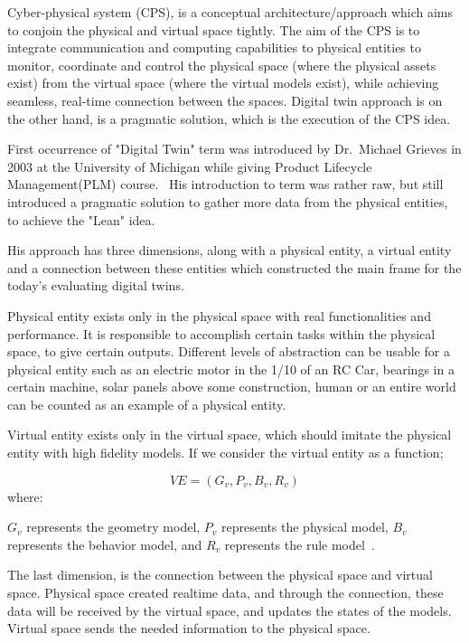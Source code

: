 \documentclass[9pt,conference]{IEEEtran}
\begin{document}
    Cyber-physical system (CPS), is a conceptual architecture/approach which aims to conjoin the physical and virtual space tightly. 
    The aim of the CPS is to integrate communication and computing capabilities to physical entities to monitor, coordinate and control the physical space (where the physical assets exist) from the virtual space (where the virtual models exist), while achieving seamless, real-time connection between the spaces.
    Digital twin approach is on the other hand, is a pragmatic solution, which is the execution of the CPS idea.~\cite{TAO20193}
    
    First occurrence of "Digital Twin" term  was introduced by Dr.~Michael Grieves in 2003 at the University of Michigan while giving  Product Lifecycle Management(PLM) course.~\cite{article}
    His introduction to term was rather raw, but still introduced a pragmatic solution to gather more data from the physical entities, to achieve the "Lean" idea.
    
    His approach has three dimensions, along with a physical entity, a virtual entity and a connection between these entities which constructed the main frame for the today's evaluating digital twins.~\cite{article}

    Physical entity exists only in the physical space with real functionalities and performance. It is responsible to accomplish certain tasks within the physical space, to give certain outputs.
    Different levels of abstraction can be usable for a physical entity such as an electric motor in the 1/10 of an RC Car, bearings in a certain machine, solar panels above some construction, human or an entire world can be counted as an example of a physical entity.

    Virtual entity exists only in the virtual space, which should imitate the physical entity with high fidelity models. If we consider the virtual entity as a function;

    \begin{equation}\label{Formulated Entity Equation}
        VE = (G_v, P_v, B_v, R_v)
    \end{equation}
    where:
    
    $G_v$ represents the geometry model, $P_v$ represents the physical model, $B_v$ represents  the behavior model, and $R_v$ represents the rule model~\cite{article}.
    
    The last dimension, is the connection between the physical space and virtual space. Physical space created realtime data, and through the connection, these data will be received by the virtual space, 
    and updates the states of the models. Virtual space sends the needed information to the physical space. 
\end{document}
